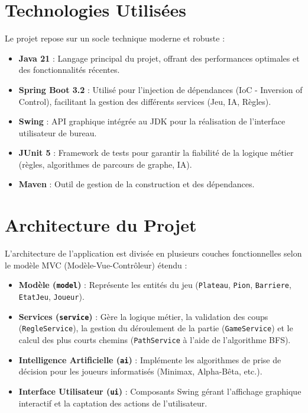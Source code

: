 \documentclass[12pt,a4paper]{article}
\begin{document}
\section{Technologies Utilisées}
Le projet repose sur un socle technique moderne et robuste :
\begin{itemize}
    \item \textbf{Java 21} : Langage principal du projet, offrant des performances optimales et des fonctionnalités récentes.
    \item \textbf{Spring Boot 3.2} : Utilisé pour l'injection de dépendances (IoC - Inversion of Control), facilitant la gestion des différents services (Jeu, IA, Règles).
    \item \textbf{Swing} : API graphique intégrée au JDK pour la réalisation de l'interface utilisateur de bureau.
    \item \textbf{JUnit 5} : Framework de tests pour garantir la fiabilité de la logique métier (règles, algorithmes de parcours de graphe, IA).
    \item \textbf{Maven} : Outil de gestion de la construction et des dépendances.
\end{itemize}

\section{Architecture du Projet}
L'architecture de l'application est divisée en plusieurs couches fonctionnelles selon le modèle MVC (Modèle-Vue-Contrôleur) étendu :
\begin{itemize}
    \item \textbf{Modèle (\texttt{model})} : Représente les entités du jeu (\texttt{Plateau}, \texttt{Pion}, \texttt{Barriere}, \texttt{EtatJeu}, \texttt{Joueur}).
    \item \textbf{Services (\texttt{service})} : Gère la logique métier, la validation des coups (\texttt{RegleService}), la gestion du déroulement de la partie (\texttt{GameService}) et le calcul des plus courts chemins (\texttt{PathService} à l'aide de l'algorithme BFS).
    \item \textbf{Intelligence Artificielle (\texttt{ai})} : Implémente les algorithmes de prise de décision pour les joueurs informatisés (Minimax, Alpha-Bêta, etc.).
    \item \textbf{Interface Utilisateur (\texttt{ui})} : Composants Swing gérant l'affichage graphique interactif et la captation des actions de l'utilisateur.
\end{itemize}
\end{document}

